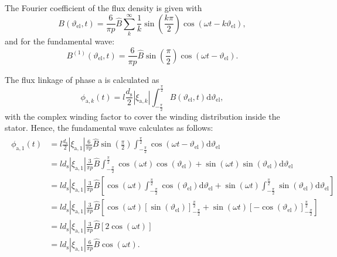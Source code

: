 \begin{solutionblock}
    The Fourier coefficient of the flux density is given with
    \begin{equation}
        B(\vartheta_{\mathrm{el}},t) = \frac{6}{\pi p} \hat{B} \sum_{k}^{\infty} \frac{1}{k} \sin\left(\frac{k\pi}{2} \right) \cos(\omega t - k \vartheta_{\mathrm{el}}),
    \end{equation}
    and for the fundamental wave:
    \begin{equation}
        B^{(1)}(\vartheta_{\mathrm{el}},t) = \frac{6}{\pi p} \hat{B} \sin\left(\frac{\pi}{2}\right) \cos(\omega t - \vartheta_{\mathrm{el}}).
    \end{equation}

    The flux linkage of phase a is calculated as
    \begin{equation}
        \phi_{\mathrm{a,}k}(t) = l \frac{d_{\mathrm{s}}}{2} |\xi_{\mathrm{a},k}| \int_{-\frac{\pi}{2}}^{\frac{\pi}{2}} B(\vartheta_{\mathrm{el}},t) \mathrm{d}\vartheta_{\mathrm{el}},
        \label{eq:phi_a_k_concentrated}
    \end{equation}
    with the complex winding factor to cover the winding distribution inside the stator.
    Hence, the fundamental wave calculates as follows:
    \begin{align}
        \begin{split}
            \phi_{\mathrm{a,}1}(t) &= l \frac{d_{\mathrm{s}}}{2} |\xi_{\mathrm{a},1}|
            \frac{6}{\pi p} \hat{B} \sin\left(\frac{\pi}{2}\right) \int_{-\frac{\pi}{2}}^{\frac{\pi}{2}} \cos(\omega t - \vartheta_{\mathrm{el}}) \mathrm{d}\vartheta_{\mathrm{el}} \\
            &= l d_{\mathrm{s}} |\xi_{\mathrm{a},1}|
            \frac{3}{\pi p} \hat{B}
            \int_{-\frac{\pi}{2}}^{\frac{\pi}{2}}\cos(\omega t) \cos(\vartheta_{\mathrm{el}}) + \sin(\omega t) \sin(\vartheta_{\mathrm{el}}) \mathrm{d}\vartheta_{\mathrm{el}} \\
            &= l d_{\mathrm{s}} |\xi_{\mathrm{a},1}|
            \frac{3}{\pi p} \hat{B}
            \left[\cos(\omega t) \int_{-\frac{\pi}{2}}^{\frac{\pi}{2}} \cos(\vartheta_{\mathrm{el}}) \mathrm{d}\vartheta_{\mathrm{el}} + \sin(\omega t) \int_{-\frac{\pi}{2}}^{\frac{\pi}{2}} \sin(\vartheta_{\mathrm{el}}) \mathrm{d} \vartheta_{\mathrm{el}} \right] \\
            &= l d_{\mathrm{s}} |\xi_{\mathrm{a},1}|
            \frac{3}{\pi p} \hat{B}
            \left[\cos(\omega t) \left[\sin(\vartheta_{\mathrm{el}}) \right]_{-\frac{\pi}{2}}^{\frac{\pi}{2}} + \sin(\omega t) \left[-\cos(\vartheta_{\mathrm{el}}) \right]_{-\frac{\pi}{2}}^{\frac{\pi}{2}} \right] \\
            &= l d_{\mathrm{s}} |\xi_{\mathrm{a},1}|
            \frac{3}{\pi p} \hat{B} \left[ 2 \cos(\omega t)\right] \\
            &= l d_{\mathrm{s}} |\xi_{\mathrm{a},1}|
            \frac{6}{\pi p} \hat{B} \cos(\omega t). \\
        \end{split}
    \end{align}


\end{solutionblock}
